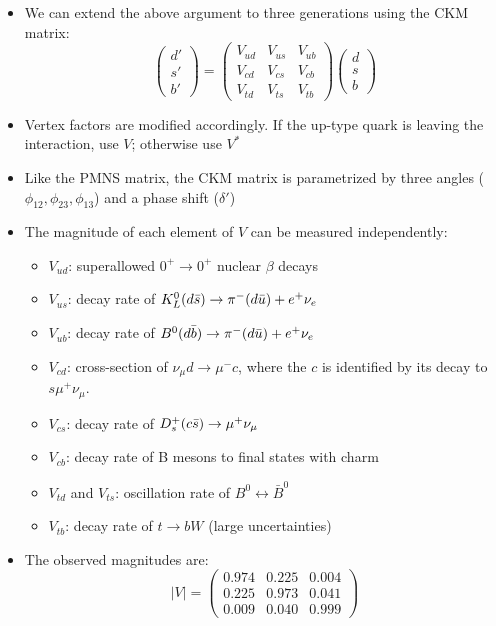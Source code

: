   \begin{itemize}
    \item We can extend the above argument to three generations using the CKM matrix:
    \begin{equation}
      \begin{pmatrix} d' \\ s' \\ b' \end{pmatrix} = 
      \begin{pmatrix} V_{ud} & V_{us} & V_{ub}\\
      V_{cd} & V_{cs} & V_{cb}\\
      V_{td} & V_{ts} & V_{tb} \end{pmatrix}
      \begin{pmatrix} d \\ s \\ b \end{pmatrix}
    \end{equation}
    \item Vertex factors are modified accordingly. If the up-type quark is leaving the interaction, use $V$; otherwise use $V^*$
    \item Like the PMNS matrix, the CKM matrix is parametrized by three angles ($\phi_{12},\phi_{23},\phi_{13}$) and a phase shift ($\delta'$)
    \item The magnitude of each element of $V$ can be measured independently:
    \begin{itemize}
      \item $V_{ud}$: superallowed $0^+\rightarrow 0^+$ nuclear $\beta$ decays
      \item $V_{us}$: decay rate of $K_L^0(d\bar{s}) \rightarrow \pi^-(d\bar{u}) + e^{+}\nu_e$
      \item $V_{ub}$: decay rate of $B^0(d\bar{b})\rightarrow  \pi^-(d\bar{u}) + e^{+}\nu_e$
      \item $V_{cd}$: cross-section of $\nu_\mu d \rightarrow \mu^- c$, where the $c$ is identified by its decay to $s \mu^+ \nu_\mu$.
      \item $V_{cs}$: decay rate of $D^+_s(c\bar{s})\rightarrow \mu^+\nu_\mu$
      \item $V_{cb}$: decay rate of B mesons to final states with charm
      \item $V_{td}$ and $V_{ts}$: oscillation rate of $B^0\leftrightarrow \bar B^0$ 
      \item $V_{tb}$: decay rate of $t\rightarrow bW$ (large uncertainties)
    \end{itemize}
    \item The observed magnitudes are:
    \begin{equation}
      |V| = \begin{pmatrix} 0.974 & 0.225 & 0.004\\
      0.225 & 0.973 & 0.041\\
      0.009 & 0.040 & 0.999 \end{pmatrix}
    \end{equation}
  \end{itemize}

